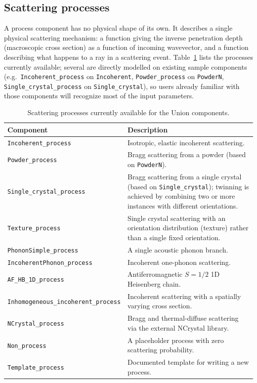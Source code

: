 \subsection{Scattering processes}
\label{sec:union-processes}

A process component has no physical shape of its own. It describes a single
physical scattering mechanism: a function giving the inverse penetration
depth (macroscopic cross section) as a function of incoming wavevector, and
a function describing what happens to a ray in a scattering event.
Table~\ref{t:union-processes} lists the processes currently available;
several are directly modelled on existing \MCS sample components (e.g.\
\texttt{Incoherent\_process} on \texttt{Incoherent}, \texttt{Powder\_process}
on \texttt{PowderN}, \texttt{Single\_crystal\_process} on
\texttt{Single\_crystal}), so users already familiar with those components
will recognize most of the input parameters.

\begin{table}[htb!]
  \begin{center}
    {\let\my=\\
    \begin{tabular}{|l|p{}|}
      \hline
      \textbf{Component} & \textbf{Description} \\
      \hline
      \texttt{Incoherent\_process} & Isotropic, elastic incoherent scattering. \\
      \texttt{Powder\_process} & Bragg scattering from a powder (based on \texttt{PowderN}). \\
      \texttt{Single\_crystal\_process} & Bragg scattering from a single crystal (based on \texttt{Single\_crystal}); twinning is achieved by combining two or more instances with different orientations. \\
      \texttt{Texture\_process} & Single crystal scattering with an orientation distribution (texture) rather than a single fixed orientation. \\
      \texttt{PhononSimple\_process} & A single acoustic phonon branch. \\
      \texttt{IncoherentPhonon\_process} & Incoherent one-phonon scattering. \\
      \texttt{AF\_HB\_1D\_process} & Antiferromagnetic $S=1/2$ 1D Heisenberg chain. \\
      \texttt{Inhomogeneous\_incoherent\_process} & Incoherent scattering with a spatially varying cross section. \\
      \texttt{NCrystal\_process} & Bragg and thermal-diffuse scattering via the external NCrystal library. \\
      \texttt{Non\_process} & A placeholder process with zero scattering probability. \\
      \texttt{Template\_process} & Documented template for writing a new process. \\
      \hline
    \end{tabular}
    \caption{Scattering processes currently available for the Union components.}
    \label{t:union-processes}
    }
  \end{center}
\end{table}

